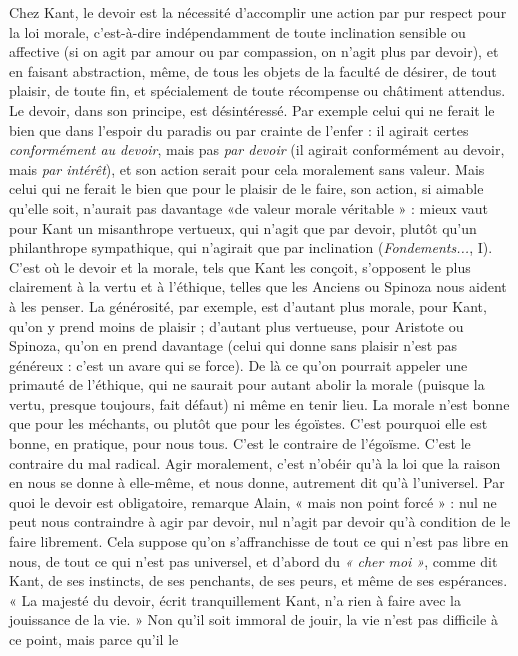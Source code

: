 Chez Kant, le devoir est la nécessité d’accomplir une action par pur respect
pour la loi morale, c’est-à-dire indépendamment de toute inclination sensible
ou affective (si on agit par amour ou par compassion, on n’agit plus par
devoir), et en faisant abstraction, même, de tous les objets de la faculté de
désirer, de tout plaisir, de toute fin, et spécialement de toute récompense ou
châtiment attendus. Le devoir, dans son principe, est désintéressé. Par exemple
celui qui ne ferait le bien que dans l'espoir du paradis ou par crainte de l’enfer :
il agirait certes {\it conformément au devoir}, mais pas {\it par devoir} (il agirait conformément
au devoir, mais {\it par intérêt}), et son action serait pour cela moralement
sans valeur. Mais celui qui ne ferait le bien que pour le plaisir de le faire, son
action, si aimable qu’elle soit, n'aurait pas davantage «de valeur morale
véritable » : mieux vaut pour Kant un misanthrope vertueux, qui n’agit que par
devoir, plutôt qu’un philanthrope sympathique, qui n’agirait que par inclination
({\it Fondements...}, I). C’est où le devoir et la morale, tels que Kant les
conçoit, s'opposent le plus clairement à la vertu et à l’éthique, telles que les
Anciens ou Spinoza nous aident à les penser. La générosité, par exemple, est
d’autant plus morale, pour Kant, qu’on y prend moins de plaisir ; d’autant plus
vertueuse, pour Aristote ou Spinoza, qu'on en prend davantage (celui qui
donne sans plaisir n’est pas généreux : c’est un avare qui se force). De là ce
qu’on pourrait appeler une primauté de l'éthique, qui ne saurait pour autant
abolir la morale (puisque la vertu, presque toujours, fait défaut) ni même en
tenir lieu. La morale n’est bonne que pour les méchants, ou plutôt que pour les
égoïstes. C’est pourquoi elle est bonne, en pratique, pour nous tous. C’est le
contraire de l’égoïsme. C’est le contraire du mal radical. Agir moralement, c’est
n’obéir qu’à la loi que la raison en nous se donne à elle-même, et nous donne,
autrement dit qu’à l’universel. Par quoi le devoir est obligatoire, remarque
Alain, « mais non point forcé » : nul ne peut nous contraindre à agir par devoir,
nul n’agit par devoir qu’à condition de le faire librement. Cela suppose qu’on
s’affranchisse de tout ce qui n’est pas libre en nous, de tout ce qui n’est pas universel,
et d’abord du {\it « cher moi »}, comme dit Kant, de ses instincts, de ses penchants,
de ses peurs, et même de ses espérances. « La majesté du devoir, écrit
tranquillement Kant, n’a rien à faire avec la jouissance de la vie. » Non qu'il
soit immoral de jouir, la vie n’est pas difficile à ce point, mais parce qu’il le
